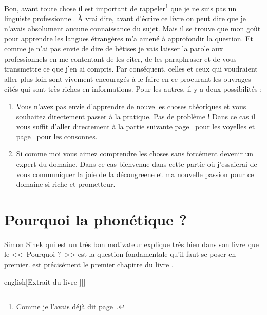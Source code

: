Bon, avant toute chose il est important de rappeler\footnote{Comme je
  l'avais déjà dit page~\pageref{sec:phonetics}.} que je ne suis pas
un linguiste professionnel. À vrai dire, avant d'écrire ce livre on
peut dire que je n'avais absolument aucune connaissance du sujet. Mais
il se trouve que mon goût pour apprendre les langues étrangères m'a
amené à approfondir la question. Et comme je n'ai pas envie de dire de
bêtises je vais laisser la parole aux professionnels en me contentant
de les citer, de les paraphraser et de vous transmettre ce que j'en ai
compris. Par conséquent, celles et ceux qui voudraient aller plus loin
sont vivement encouragés à le faire en ce procurant les ouvrages cités
qui sont très riches en informations. Pour les autres, il y a deux
possibilités :
\begin{enumerate}
\item Vous n'avez pas envie d'apprendre de nouvelles choses théoriques
  et vous souhaitez directement passer à la pratique. Pas de problème
  ! Dans ce cas il vous suffit d'aller directement à la partie
  suivante page~\pageref{part:vow} pour les voyelles et
  page~\pageref{part:conson} pour les consonnes.
\item Si comme moi vous aimez comprendre les choses sans forcément
  devenir un expert du domaine. Dans ce cas bienvenue dans cette
  partie où j'essaierai de vous communiquer la joie de la décougreene
  et ma nouvelle passion pour ce domaine si riche et prometteur.  
\end{enumerate}

\chapter{Pourquoi la phonétique ?}\label{chap:phonetic}

\href{https://fr.wikipedia.org/wiki/Simon_Sinek}{Simon Sinek} qui est
un très bon motivateur explique très bien dans son livre
\href{https://amzn.to/2qY8uMD}{} que 
le <<~Pourquoi ?~>> est la question fondamentale qu'il faut se poser
en premier.  est précisément le premier chapitre
du livre \lodge.

\begin{foreigndisplayquote}{english}[Extrait du livre \lodge][]
\end{foreigndisplayquote}

